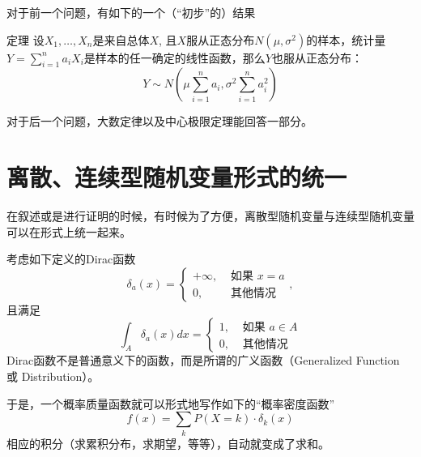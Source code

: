 \begin{frame}

对于前一个问题，有如下的一个（``初步''的）结果
\begin{block}{定理}
设$X_1,\ldots,X_n$是来自总体$X$, 且$X$服从正态分布$N(\mu, \sigma^2)$的样本，统计量$Y = \sum\limits_{i=1}^n a_iX_i$是样本的任一确定的线性函数，那么$Y$也服从正态分布：
$$Y \sim N \left( \mu \sum\limits_{i=1}^n a_i, \sigma^2 \sum\limits_{i=1}^n a_i^2 \right)$$
\end{block}

\vspace{1em}
对于后一个问题，大数定律以及中心极限定理能回答一部分。

\end{frame}


\section{离散、连续型随机变量形式的统一}


\begin{frame}

在叙述或是进行证明的时候，有时候为了方便，离散型随机变量与连续型随机变量可以在形式上统一起来。

\vspace{1em}

考虑如下定义的Dirac函数
$$\delta_a(x) = \begin{cases}
+\infty, & \text{ 如果 } x = a \\
0, & \text{ 其他情况 }
\end{cases},$$
且满足
$$\int_{A} \delta_a(x)dx = \begin{cases}
1, & \text{ 如果 } a \in A \\
0, & \text{ 其他情况 }
\end{cases}$$
Dirac函数不是普通意义下的函数，而是所谓的广义函数（Generalized Function 或 Distribution）。

\end{frame}


\begin{frame}

于是，一个概率质量函数就可以形式地写作如下的``概率密度函数''
$$f(x) = \sum\limits_k P(X=k) \cdot \delta_k(x)$$
相应的积分（求累积分布，求期望，等等），自动就变成了求和。

\end{frame}


